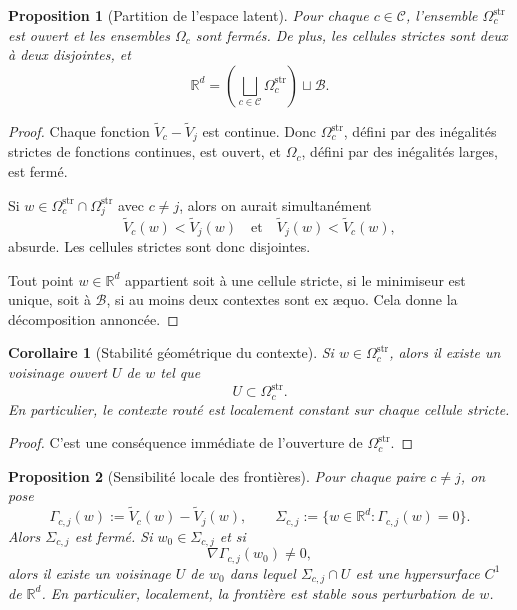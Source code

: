 \documentclass[11pt,a4paper]{article}
\newtheorem{proposition}{Proposition}[section]
\newtheorem{corollary}{Corollaire}[section]
\newcommand{\R}{\mathbb R}
\newcommand{\Ccal}{\mathcal C}
\begin{document}
\begin{proposition}[Partition de l'espace latent]
Pour chaque \(c\in\Ccal\), l'ensemble \(\Omega_c^{\mathrm{str}}\) est ouvert et les ensembles \(\Omega_c\) sont fermés. De plus, les cellules strictes sont deux à deux disjointes, et
\[
\R^d
=
\left(\bigsqcup_{c\in\Ccal}\Omega_c^{\mathrm{str}}\right)\sqcup \mathcal B.
\]
\end{proposition}

\begin{proof}
Chaque fonction \(\widetilde V_c-\widetilde V_j\) est continue. Donc \(\Omega_c^{\mathrm{str}}\), défini par des inégalités strictes de fonctions continues, est ouvert, et \(\Omega_c\), défini par des inégalités larges, est fermé.

Si \(w\in\Omega_c^{\mathrm{str}}\cap\Omega_j^{\mathrm{str}}\) avec \(c\neq j\), alors on aurait simultanément
\[
\widetilde V_c(w)<\widetilde V_j(w)
\quad\text{et}\quad
\widetilde V_j(w)<\widetilde V_c(w),
\]
absurde. Les cellules strictes sont donc disjointes.

Tout point \(w\in\R^d\) appartient soit à une cellule stricte, si le minimiseur est unique, soit à \(\mathcal B\), si au moins deux contextes sont ex æquo. Cela donne la décomposition annoncée.
\end{proof}

\begin{corollary}[Stabilité géométrique du contexte]
Si \(w\in\Omega_c^{\mathrm{str}}\), alors il existe un voisinage ouvert \(U\) de \(w\) tel que
\[
U\subset \Omega_c^{\mathrm{str}}.
\]
En particulier, le contexte routé est localement constant sur chaque cellule stricte.
\end{corollary}

\begin{proof}
C'est une conséquence immédiate de l'ouverture de \(\Omega_c^{\mathrm{str}}\).
\end{proof}

\begin{proposition}[Sensibilité locale des frontières]
Pour chaque paire \(c\neq j\), on pose
\[
\Gamma_{c,j}(w):=\widetilde V_c(w)-\widetilde V_j(w),
\qquad
\Sigma_{c,j}:=\{w\in\R^d:\Gamma_{c,j}(w)=0\}.
\]
Alors \(\Sigma_{c,j}\) est fermé. Si \(w_0\in\Sigma_{c,j}\) et si
\[
\nabla \Gamma_{c,j}(w_0)\neq 0,
\]
alors il existe un voisinage \(U\) de \(w_0\) dans lequel \(\Sigma_{c,j}\cap U\) est une hypersurface \(C^1\) de \(\R^d\). En particulier, localement, la frontière est stable sous perturbation de \(w\).
\end{proposition}
\end{document}
